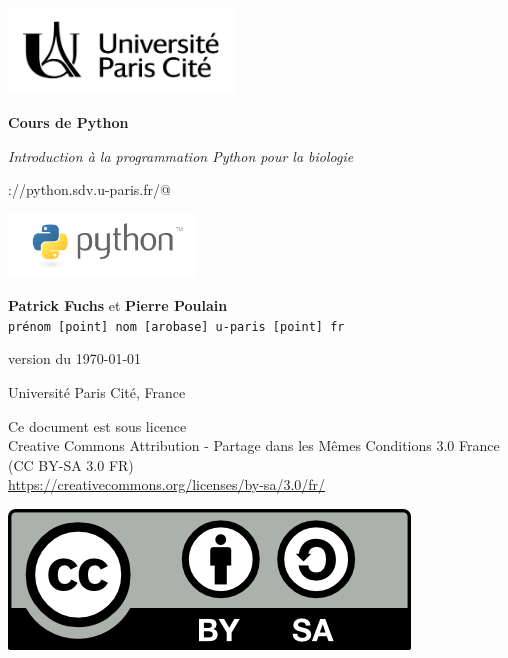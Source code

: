\documentclass[10pt]{book}
\begin{document}
\thispagestyle{empty}

\begin{titlepage}

\begin{center}

\includegraphics[width=6cm]{img/logo_Univ_Paris_Cite.png}

\vspace{3cm}

{\Huge \bf Cours de Python}
\vspace{0.5cm}

{\itshape \Large
Introduction à la programmation Python pour la biologie
}
\vspace{0.5cm}

\verb@https://python.sdv.u-paris.fr/@
\vspace{4cm}

\includegraphics[width=5cm]{img/logo_python.png} \\
\vspace{0.5cm}

{\large
	{\bf Patrick Fuchs} et {\bf Pierre Poulain} \\
	{\tt prénom [point] nom [arobase] u-paris [point] fr}
}
\vspace{4cm}

version du \today
\vspace{2cm}

Université Paris Cité, France

\vfill

\begin{minipage}{0.80\textwidth}
\footnotesize
Ce document est sous licence \\
Creative Commons Attribution - Partage dans les Mêmes Conditions 3.0 France \\
(CC BY-SA 3.0 FR) \\
\url{https://creativecommons.org/licenses/by-sa/3.0/fr/}
\end{minipage}
\begin{minipage}{0.15\textwidth}
\includegraphics{img/logo_CC-BY-SA.png}
\end{minipage}


\end{center}
\end{titlepage}
\end{document}
